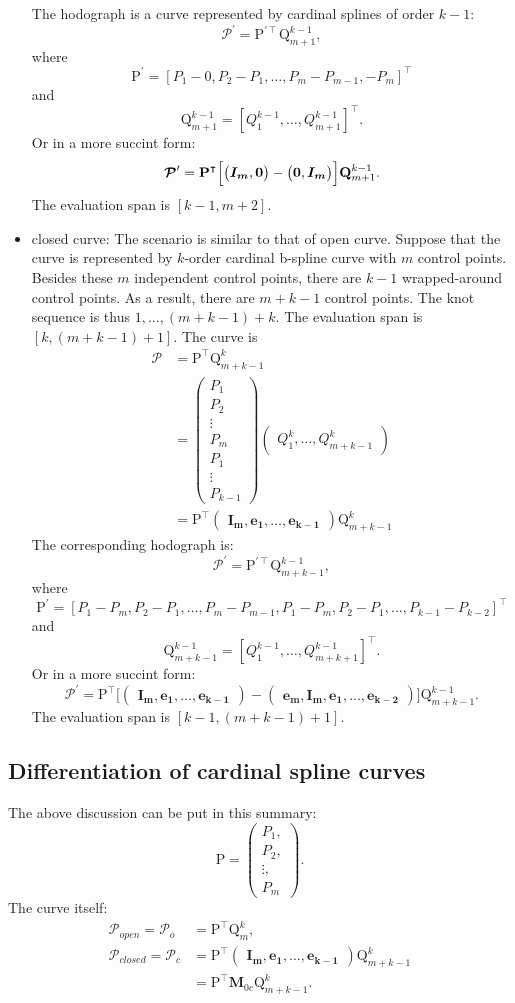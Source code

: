 \documentclass[11pt]{article}
\newcommand{\bmmp}{\bm{\mathcal{P}}} %
\newcommand{\vP}{\bm{\mathrm{P}}} %
\newcommand{\vPT}{\bm{\mathrm{P}}^{\intercal}}
\newcommand{\vQ}{\bm{\mathrm{Q}}} %
\newcommand{\mM}{\mathbf{M}} %
\newcommand{\odml}{\begin{pmatrix}\bm{I_m},\bm{0}\end{pmatrix}}
\newcommand{\odmr}{\begin{pmatrix}\bm{0},\bm{I_m}\end{pmatrix}}
\newcommand{\cdml}{\begin{pmatrix}\bm{I_m},\bm{e_1},\dots,\bm{e_{k-1}}\end{pmatrix}}
\newcommand{\cdmr}{\begin{pmatrix}\bm{e_m},\bm{I_m},\bm{e_1},\dots,\bm{e_{k-2}}\end{pmatrix}}
\begin{document}
\begin{itemize}
The hodograph is a curve represented by cardinal splines of order $k-1$:
\[
\bmmp^{\prime}=\vP^{\prime\intercal}\vQ^{k-1}_{m+1},
\]
where 
\[
\vP^{\prime}=[P_1-0,P_2-P_1,\dots,P_m-P_{m-1},-P_m]^\intercal
\]
and
\[
\vQ^{k-1}_{m+1}=[Q^{k-1}_1,\dots,Q^{k-1}_{m+1}]^\intercal.
\]
Or in a more succint form:
\[
\bmmp^{\prime} = \vPT \Bigl[\odml - \odmr\Bigr] \vQ^{k-1}_{m+1}.
\]
The evaluation span is $[k-1,m+2]$.
\item closed curve:
The scenario is similar to that of open curve. Suppose that the curve is represented by $k$-order cardinal b-spline curve with $m$ control points. Besides these $m$ independent control points, there are $k-1$ wrapped-around control points. As a result, there are $m+k-1$ control points. The knot sequence is thus $1, \dots, (m+k-1)+k$. The evaluation span is $[k,(m+k-1)+1]$. The curve is
\[
\begin{split}
\bmmp&=\vPT\vQ^k_{m+k-1} \\
&=
\begin{pmatrix}
P_1 \\
P_2 \\
\vdots \\
P_m \\
P_1 \\
\vdots \\
P_{k-1}
\end{pmatrix}
\begin{pmatrix}
Q^k_1,\dots,Q^k_{m+k-1}
\end{pmatrix} \\
&= \vPT
\cdml
\vQ^k_{m+k-1}
\end{split}
\]
The corresponding hodograph is:
\[
\bmmp^{\prime}=\vP^{\prime\intercal}\vQ^{k-1}_{m+k-1},
\]
where
\[
\vP^\prime=[P_1-P_m,P_2-P_1,\dots,P_m-P_{m-1},P_1-P_m,P_2-P_1,\dots,P_{k-1}-P_{k-2}]^\intercal
\]
and
\[
\vQ^{k-1}_{m+k-1}=[Q^{k-1}_1,\dots,Q^{k-1}_{m+k+1}]^\intercal.
\]
Or in a more succint form:
\[
\bmmp^\prime = \vPT \biggl[ \cdml - \cdmr \biggr] \vQ^{k-1}_{m+k-1}.
\]
The evaluation span is $[k-1,(m+k-1)+1]$.
\end{itemize}

\subsection{Differentiation of cardinal spline curves}\label{subsec:diff_card}
The above discussion can be put in this summary:
\[
\vP = 
\begin{pmatrix}
P_1,\\
P_2,\\
\vdots,\\
P_m
\end{pmatrix}.
\]
The curve itself:
\[
\begin{split}
\bmmp_{open} = \bmmp_o &= \vPT\vQ^k_m ,\\
\bmmp_{closed} = \bmmp_c &= \vPT \cdml \vQ^k_{m+k-1} \\
&= \vPT \mM_{0c} \vQ^k_{m+k-1}.
\end{split}
\]
\end{document}
